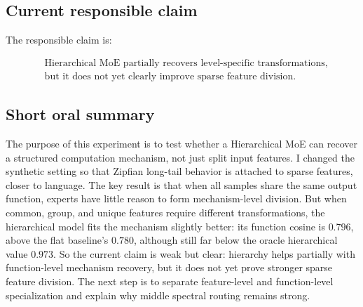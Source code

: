 \documentclass[11pt]{article}
\begin{document}
\subsection{Current responsible claim}

The responsible claim is:

$$
\begin{aligned}
&\text{Hierarchical MoE partially recovers level-specific transformations,}\\
&\text{but it does not yet clearly improve sparse feature division.}
\end{aligned}
$$

\subsection{Short oral summary}

The purpose of this experiment is to test whether a Hierarchical MoE can recover a structured computation mechanism, not just split input features. I changed the synthetic setting so that Zipfian long-tail behavior is attached to sparse features, closer to language. The key result is that when all samples share the same output function, experts have little reason to form mechanism-level division. But when common, group, and unique features require different transformations, the hierarchical model fits the mechanism slightly better: its function cosine is $0.796$, above the flat baseline's $0.780$, although still far below the oracle hierarchical value $0.973$. So the current claim is weak but clear: hierarchy helps partially with function-level mechanism recovery, but it does not yet prove stronger sparse feature division. The next step is to separate feature-level and function-level specialization and explain why middle spectral routing remains strong.
\end{document}
